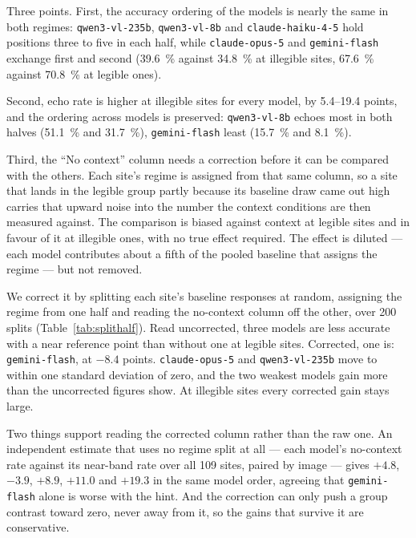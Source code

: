 \documentclass[10pt,a4paper]{article}
\begin{document}
Three points. First, the accuracy ordering of the models is nearly the same in
both regimes: \texttt{qwen3-vl-235b}, \texttt{qwen3-vl-8b} and
\texttt{claude-haiku-4-5} hold positions three to five in each half, while
\texttt{claude-opus-5} and \texttt{gemini-flash} exchange first and second
(\SI{39.6}{\percent} against \SI{34.8}{\percent} at illegible sites,
\SI{67.6}{\percent} against \SI{70.8}{\percent} at legible ones).

Second, echo rate is higher at illegible sites for every model, by
\numrange{5.4}{19.4} points, and the ordering across models is preserved:
\texttt{qwen3-vl-8b} echoes most in both halves (\SI{51.1}{\percent} and
\SI{31.7}{\percent}), \texttt{gemini-flash} least (\SI{15.7}{\percent} and
\SI{8.1}{\percent}).

Third, the ``No context'' column needs a correction before it can be compared
with the others. Each site's regime is assigned from that same column, so a
site that lands in the legible group partly because its baseline draw came out
high carries that upward noise into the number the context conditions are then
measured against. The comparison is biased against context at legible sites and
in favour of it at illegible ones, with no true effect required. The effect is
diluted --- each model contributes about a fifth of the pooled baseline that
assigns the regime --- but not removed.

We correct it by splitting each site's baseline responses at random, assigning
the regime from one half and reading the no-context column off the other, over
\num{200} splits (Table~\ref{tab:splithalf}). Read uncorrected, three models
are less accurate with a near reference point than without one at legible
sites. Corrected, one is: \texttt{gemini-flash}, at $-\num{8.4}$ points.
\texttt{claude-opus-5} and \texttt{qwen3-vl-235b} move to within one standard
deviation of zero, and the two weakest models gain more than the uncorrected
figures show. At illegible sites every corrected gain stays large.

Two things support reading the corrected column rather than the raw one. An
independent estimate that uses no regime split at all --- each model's
no-context rate against its near-band rate over all \num{109} sites, paired by
image --- gives $+\num{4.8}$, $-\num{3.9}$, $+\num{8.9}$, $+\num{11.0}$ and
$+\num{19.3}$ in the same model order, agreeing that
\texttt{gemini-flash} alone is worse with the hint. And the correction can only
push a group contrast toward zero, never away from it, so the gains that
survive it are conservative.
\end{document}
